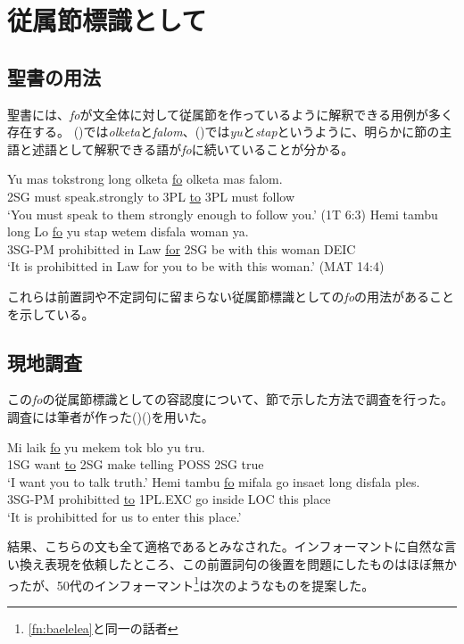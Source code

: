 \section{従属節標識として}
\subsection{聖書の用法}
聖書には、\textit{fo}が文全体に対して従属節を作っているように解釈できる用例が多く存在する。
()では\textit{olketa}と\textit{falom}、()では\textit{yu}と\textit{stap}というように、明らかに節の主語と述語として解釈できる語が\textit{fo}に続いていることが分かる。

\begin{exe}
\ex
\gll Yu mas tokstrong long olketa \underline{fo} olketa mas falom.\\
2SG must speak.strongly to 3PL \underline{to} 3PL must follow\\
\glt `You must speak to them strongly enough to follow you.' (1T 6:3)
\ex
\gll Hemi tambu long Lo \underline{fo} yu stap wetem disfala woman ya.\\
3SG-PM prohibitted in Law \underline{for} 2SG be with this woman DEIC\\
\glt `It is prohibitted in Law for you to be with this woman.' (MAT 14:4)
\end{exe}

これらは前置詞や不定詞句に留まらない従属節標識としての\textit{fo}の用法があることを示している。

\subsection{現地調査}
この\textit{fo}の従属節標識としての容認度について、\label{sec:howexamined}節で示した方法で調査を行った。調査には筆者が作った()()を用いた。

\begin{exe}
\ex
\gll Mi laik \underline{fo} yu mekem tok blo yu tru.\\
1SG want \underline{to} 2SG make telling POSS 2SG true\\
\glt `I want you to talk truth.'
\ex\label{ex:tambufo}
\gll Hemi tambu \underline{fo} mifala go insaet long disfala ples.\\
3SG-PM prohibitted \underline{to} 1PL.EXC go inside LOC this place\\
\glt `It is prohibitted for us to enter this place.'
\end{exe}

結果、こちらの文も全て適格であるとみなされた。インフォーマントに自然な言い換え表現を依頼したところ、この前置詞句の後置を問題にしたものはほぼ無かったが、50代のインフォーマント\footnote{\ref{fn:baelelea}と同一の話者}は次のようなものを提案した。

